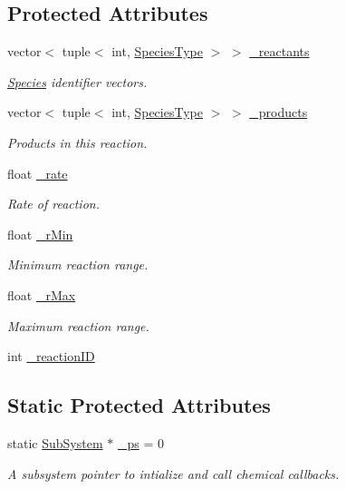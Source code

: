 \subsection*{Protected Attributes}
\begin{DoxyCompactItemize}
\item 
vector$<$ tuple$<$ int, \hyperlink{Species_8h_a50651af47c56ea0e27235468d23542cf}{Species\+Type} $>$ $>$ \hyperlink{classCrossFilamentRxnManager_ad1c41fba7b85d5eedee363b8eeb472d4}{\+\_\+reactants}
\begin{DoxyCompactList}\small\item\em \hyperlink{classSpecies}{Species} identifier vectors. \end{DoxyCompactList}\item 
vector$<$ tuple$<$ int, \hyperlink{Species_8h_a50651af47c56ea0e27235468d23542cf}{Species\+Type} $>$ $>$ \hyperlink{classCrossFilamentRxnManager_a935b5ee4f96177021901e55ab213665e}{\+\_\+products}
\begin{DoxyCompactList}\small\item\em Products in this reaction. \end{DoxyCompactList}\item 
float \hyperlink{classCrossFilamentRxnManager_a653389d857c83927af4e621963af3ab1}{\+\_\+rate}
\begin{DoxyCompactList}\small\item\em Rate of reaction. \end{DoxyCompactList}\item 
float \hyperlink{classCrossFilamentRxnManager_a0822316b3a9bea17ceecc12231ae8eee}{\+\_\+r\+Min}
\begin{DoxyCompactList}\small\item\em Minimum reaction range. \end{DoxyCompactList}\item 
float \hyperlink{classCrossFilamentRxnManager_a8027479055b5bc902c2f3eab39fc6d50}{\+\_\+r\+Max}
\begin{DoxyCompactList}\small\item\em Maximum reaction range. \end{DoxyCompactList}\item 
int \hyperlink{classCrossFilamentRxnManager_a97369fa2db6318dd7b60c3772087b4e1}{\+\_\+reaction\+I\+D}
\end{DoxyCompactItemize}
\subsection*{Static Protected Attributes}
\begin{DoxyCompactItemize}
\item 
static \hyperlink{classSubSystem}{Sub\+System} $\ast$ \hyperlink{classCrossFilamentRxnManager_ae13a9fd2fddc2cf5e21df314aba43fdf}{\+\_\+ps} = 0
\begin{DoxyCompactList}\small\item\em A subsystem pointer to intialize and call chemical callbacks. \end{DoxyCompactList}\end{DoxyCompactItemize}


